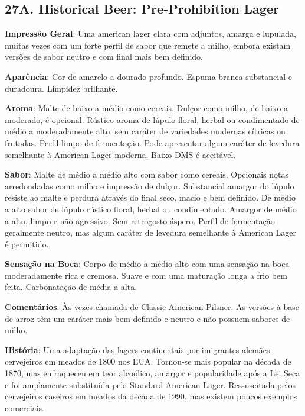 \subsection*{27A. Historical Beer: Pre-Prohibition Lager}

\textbf{Impressão Geral}: Uma american lager clara com adjuntos, amarga e lupulada, muitas vezes com um forte perfil de sabor que remete a milho, embora existam versões de sabor neutro e com final mais bem definido.

\textbf{Aparência}: Cor de amarelo a dourado profundo. Espuma branca substancial e duradoura. Limpidez brilhante.

\textbf{Aroma}: Malte de baixo a médio como cereais. Dulçor como milho, de baixo a moderado, é opcional. Rústico aroma de lúpulo floral, herbal ou condimentado de médio a moderadamente alto, sem caráter de variedades modernas cítricas ou frutadas. Perfil limpo de fermentação. Pode apresentar algum caráter de levedura semelhante à American Lager moderna. Baixo DMS é aceitável.

\textbf{Sabor}: Malte de médio a médio alto com sabor como cereais. Opcionais notas arredondadas como milho e impressão de dulçor. Substancial amargor do lúpulo resiste ao malte e perdura através do final seco, macio e bem definido. De médio a alto sabor de lúpulo rústico floral, herbal ou condimentado. Amargor de médio a alto, limpo e não agressivo. Sem retrogosto áspero. Perfil de fermentação geralmente neutro, mas algum caráter de levedura semelhante à American Lager é permitido.

\textbf{Sensação na Boca}: Corpo de médio a médio alto com uma sensação na boca moderadamente rica e cremosa. Suave e com uma maturação longa a frio bem feita. Carbonatação de média a alta.

\textbf{Comentários}: Às vezes chamada de Classic American Pilsner. As versões à base de arroz têm um caráter mais bem definido e neutro e não possuem sabores de milho.

\textbf{História}: Uma adaptação das lagers continentais por imigrantes alemães cervejeiros em meados de 1800 nos EUA. Tornou-se mais popular na década de 1870, mas enfraqueceu em teor alcoólico, amargor e popularidade após a Lei Seca e foi amplamente substituída pela Standard American Lager. Ressuscitada pelos cervejeiros caseiros em meados da década de 1990, mas existem poucos exemplos comerciais.

